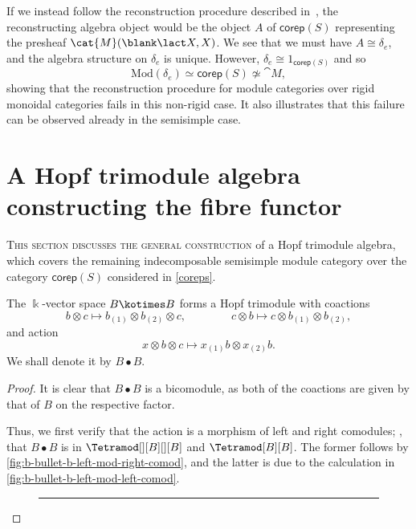 If we instead follow the reconstruction procedure described in~\cite[Chapter~7]{Etingof2015},
the reconstructing algebra object would be the object \(A\) of \(\mathsf{corep}(S)\)
representing the presheaf \(\cat{M}(\blank \lact X, X)\).
We see that we must have \(A \cong \delta_{e}\),
and the algebra structure on \(\delta_{e}\) is unique.
However, \(\delta_{e} \cong 1_{\mathsf{corep}(S)}\) and so
\[
  \mathrm{Mod}(\delta_{e}) \simeq \mathsf{corep}(S) \not\simeq \cat{M},
\]
showing that the reconstruction procedure for module categories over rigid monoidal categories fails in this non-rigid case.
It also illustrates that this failure can be observed already in the semisimple case.

\section{A Hopf trimodule algebra constructing the fibre functor}\label{fiberfunctorthings}

\textsc{This section discusses the general construction}
of a Hopf trimodule algebra,
which covers the remaining indecomposable semisimple module category over the category \(\mathsf{corep}(S)\) considered in \cref{coreps}.

\begin{proposition}\label{prop:B-dot-B-trimodule}
  The \(\Bbbk\)\hyp{}vector space \(B \kotimes B\) forms a Hopf trimodule
  with coactions
  \[
    b \otimes c \mapsto b_{(1)} \otimes b_{(2)} \otimes c,\qquad\qquad
    c \otimes b \mapsto c \otimes b_{(1)} \otimes b_{(2)},
  \]
  and action
  \[
    x \otimes b \otimes c \mapsto x_{(1)}b \otimes x_{(2)}b.
  \]
  We shall denote it by \(B \bullet B\).
\end{proposition}
\begin{proof}
  It is clear that \(B \bullet B\) is a bicomodule,
  as both of the coactions are given by that of \(B\) on the respective factor.

  Thus, we first verify that the action is a morphism of left and right comodules;
  \ie, that \(B \bullet B\) is in \(\Tetramod[][B][][B]\) and \(\Tetramod[B][B]\).
  The former follows by \cref{fig:b-bullet-b-left-mod-right-comod},
  and the latter is due to the calculation in \cref{fig:b-bullet-b-left-mod-left-comod}.
  \begin{figure}[htbp]
    \centering
    \vspace{-\onelineskip}
  \end{figure}
  \begin{figure}[htbp]
    \centering
    \hrule\vspace{\onelineskip}
    \vspace{-\onelineskip}
  \end{figure}
\end{proof}

